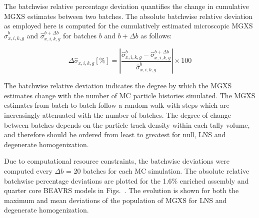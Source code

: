 The batchwise relative percentage deviation quantifies the change in cumulative \ac{MGXS} estimates between two batches. The absolute batchwise relative deviation as employed here is computed for the cumulatively estimated microscopic \ac{MGXS} $\hat{\sigma}_{x,i,k,g}^{b}$ and $\hat{\sigma}_{x,i,k,g}^{b+\Delta b}$ for batches $b$ and $b + \Delta b$ as follows:

\begin{equation}
\label{eqn:chap9-batchwise-deviation}
\Delta \hat{\sigma}_{x,i,k,g} [\%] = \left|\frac{\hat{\sigma}_{x,i,k,g}^{b} - \hat{\sigma}_{x,i,k,g}^{b+\Delta b}}{\hat{\sigma}_{x,i,k,g}^{b}}\right| \times 100
\end{equation}

\noindent The batchwise relative deviation indicates the degree by which the \ac{MGXS} estimates change with the number of \ac{MC} particle histories simulated. The \ac{MGXS} estimates from batch-to-batch follow a random walk with steps which are increasingly attenuated with the number of batches. The degree of change between batches depends on the particle track density within each tally volume, and therefore should be ordered from least to greatest for null, \ac{LNS} and degenerate homogenization.

Due to computational resource constraints, the batchwise deviations were computed every $\Delta b$ = 20 batches for each \ac{MC} simulation. The absolute relative batchwise percentage deviations are plotted for the 1.6\% enriched assembly and quarter core \ac{BEAVRS} models in Figs.~. The evolution is shown for both the maximum and mean deviations of the population of \ac{MGXS} for \ac{LNS} and degenerate homogenization.

